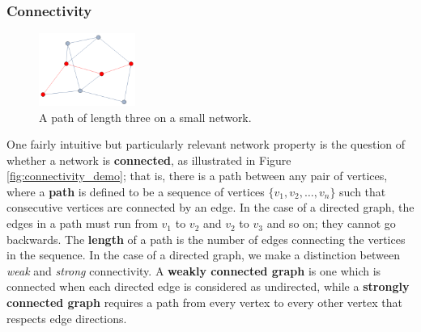 \documentclass[12pt]{thesis}
\theoremstyle{plain}
\theoremstyle{definition}
\theoremstyle{remark}
\begin{document}
\subsubsection{Connectivity}

\begin{figure}
\centering
\vspace{-5pt}
\includegraphics[width=0.28\textwidth]{path_demo.png}
\caption{A path of length three on a small network.}
\vspace{-10pt}
\label{fig:path_demo}
\end{figure}

One fairly intuitive but particularly relevant network property is the question of whether a network is \textbf{connected}, as illustrated in Figure \ref{fig:connectivity_demo}; that is, there is a path between any pair of vertices, where a  \textbf{path} is defined to be a sequence of vertices $\{v_1, v_2, \dots, v_n\}$ such that consecutive vertices are connected by an edge. In the case of a directed graph, the edges in a path must run from $v_1$ to $v_2$ and $v_2$ to $v_3$ and so on; they cannot go backwards. The \textbf{length} of a path is the number of edges connecting the vertices in the sequence. In the case of a directed graph, we make a distinction between \textit{weak} and \textit{strong} connectivity. A \textbf{weakly connected graph} is one which is connected when each directed edge is considered as undirected, while a \textbf{strongly connected graph} requires a path from every vertex to every other vertex that respects edge directions. 
\end{document}

